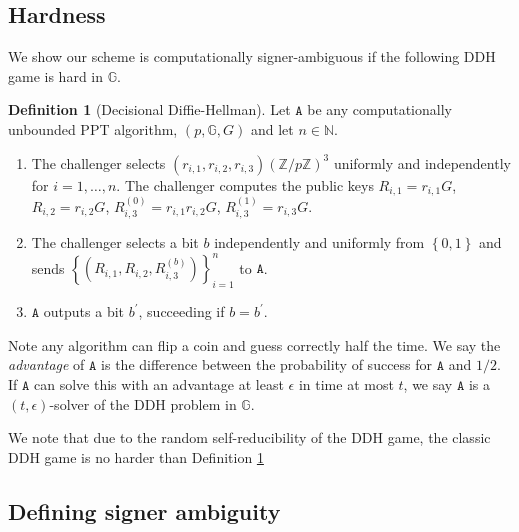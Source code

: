 \documentclass{article}
\theoremstyle{plain}
\theoremstyle{definition}
\newtheorem{defn}{Definition}[section]
\begin{document}
\subsection{Hardness}

We show our scheme is computationally signer-ambiguous if the following DDH game is hard in $\mathbb{G}$.

\begin{defn}[Decisional Diffie-Hellman]\label{ddhgame} Let $\texttt{A}$ be any computationally unbounded PPT algorithm, $(p, \mathbb{G}, G)$ and let $n \in \mathbb{N}$.
\begin{enumerate}
\item The challenger selects $(r_{i,1}, r_{i,2}, r_{i,3}) \left(\mathbb{Z}/p\mathbb{Z}\right)^3$ uniformly and independently for $i=1, \ldots, n$. The challenger computes the public keys $R_{i,1} = r_{i,1} G$, $R_{i,2} = r_{i,2}G$, $R_{i,3}^{(0)} = r_{i,1} r_{i,2} G$, $R_{i,3}^{(1)} = r_{i,3} G$.

\item The challenger selects a bit $b$ independently and uniformly from $\left\{0,1\right\}$ and sends $\left\{(R_{i,1}, R_{i,2}, R_{i,3}^{(b)})\right\}_{i=1}^{n}$ to $\texttt{A}$.

\item $\texttt{A}$ outputs a bit $b^\prime$, succeeding if $b = b^\prime$.
\end{enumerate}

Note any algorithm can flip a coin and guess correctly half the time. We say the \textit{advantage} of $\texttt{A}$ is the difference between the probability of success for $\texttt{A}$ and $1/2$. If $\texttt{A}$ can solve this with an advantage at least $\epsilon$ in time at most $t$, we say $\texttt{A}$ is a $(t,\epsilon)$-solver of the DDH problem in $\mathbb{G}$. 

\end{defn}


We note that due to the random self-reducibility of the DDH game, the classic DDH game is no harder than Definition \ref{ddhgame}
\subsection{Defining signer ambiguity}
\end{document}
